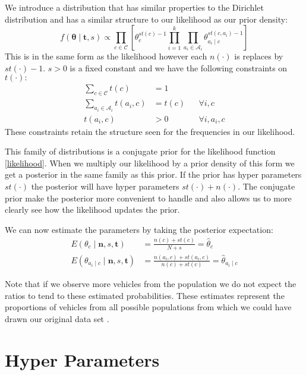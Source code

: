 We introduce a distribution that has similar properties to the Dirichlet distribution and has a similar structure to our likelihood as our prior density:
\begin{equation} \label{prior}
	f(\mathbf{\theta} \mid \mathbf{t}, s) \propto \prod_{c \in \mathcal{C}} \left[ \theta_c^{st(c) - 1} \prod_{i=1}^k \prod_{a_i \in \mathcal{A}_i} \theta_{a_i \mid c}^{st(c, a_i) - 1} \right]
\end{equation}
This is in the same form as the likelihood however each $n(\cdot)$ is replaces by $st(\cdot) - 1$.
$s > 0$ is a fixed constant and we have the following constraints on $t(\cdot):$
\begin{align}\label{prior_constraints}
	\sum_{c \in \mathcal{C}} t(c) & = 1 \\
	\sum_{a_i \in \mathcal{A}_i} t(a_i, c) & = t(c) && \forall i, c \\
	t(a_i, c) & > 0 && \forall i, a_i, c
\end{align}
These constraints retain the structure seen for the frequencies in our likelihood.

This family of distributions is a conjugate prior for the likelihood function \cref{likelihood}.
When we multiply our likelihood by a prior density of this form we get a posterior in the same family as this prior.
If the prior has hyper parameters $st(\cdot)$ the posterior will have hyper parameters $st(\cdot) + n(\cdot)$.
The conjugate prior make the posterior more convenient to handle and also allows us to more clearly see how the likelihood updates the prior.

We can now estimate the parameters by taking the posterior expectation:
\begin{align}
	E(\theta_c \mid \mathbf{n},s,\mathbf{t}) & = \frac{n(c) + st(c)}{N + s} = \hat{\theta}_c \\
	E(\theta_{a_i \mid c} \mid \mathbf{n},s,\mathbf{t}) & = \frac{n(a_i, c) + st(a_i, c)}{n(c) + st(c)} = \hat{\theta}_{a_i \mid c}
\end{align}

Note that if we observe more vehicles from the population we do not expect the ratios to tend to these estimated probabilities.
These estimates represent the proportions of vehicles from all possible populations from which we could have drawn our original data set \cite{Lidstone20}.

\section{Hyper Parameters}

